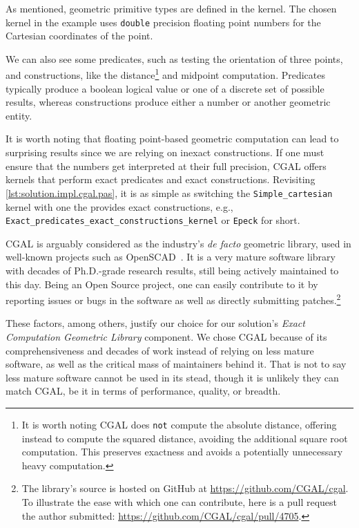 As mentioned, geometric primitive types are defined in the kernel.  The chosen
kernel in the example uses \texttt{double} precision floating point numbers for
the Cartesian coordinates of the point.

We can also see some predicates, such as testing the orientation of three
points, and constructions, like the distance\footnote{It is worth noting
\ac{CGAL} does \texttt{not} compute the absolute distance, offering instead to
compute the squared distance, avoiding the additional square root computation.
This preserves exactness and avoids a potentially unnecessary heavy
computation.} and midpoint computation.  Predicates typically produce a boolean
logical value or one of a discrete set of possible results, whereas
constructions produce either a number or another geometric entity.

It is worth noting that floating point-based geometric computation can lead to
surprising results since we are relying on inexact constructions.  If one must
ensure that the numbers get interpreted at their full precision, \ac{CGAL}
offers kernels that perform exact predicates and exact constructions.
Revisiting \cref{lst:solution.impl.cgal.pas}, it is as simple as switching the
\texttt{Simple\_cartesian} kernel with one the provides exact constructions,
e.g., \texttt{Exact\_predicates\_exact\_constructions\_kernel} or \texttt{Epeck}
for short.

\ac{CGAL} is arguably considered as the industry's \textit{de facto} geometric
library, used in well-known projects such as
OpenSCAD~\cite{Kintel:2019:OpenSCAD}.  It is a very mature software library with
decades of Ph.D.-grade research results, still being actively maintained to this
day.  Being an Open Source project, one can easily contribute to it by reporting
issues or bugs in the software as well as directly submitting
patches.\footnote{The library's source is hosted on GitHub at
\url{https://github.com/CGAL/cgal}.  To illustrate the ease with which one can
contribute, here is a pull request the author submitted:
\url{https://github.com/CGAL/cgal/pull/4705}.}

These factors, among others, justify our choice for our solution's \textit{Exact
Computation Geometric Library} component.  We chose \ac{CGAL} because of its
comprehensiveness and decades of work instead of relying on less mature
software, as well as the critical mass of maintainers behind it.  That is not to
say less mature software cannot be used in its stead, though it is unlikely they
can match \ac{CGAL}, be it in terms of performance, quality, or breadth.

